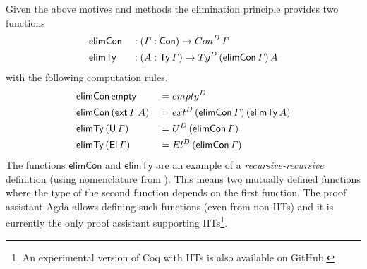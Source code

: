 \documentclass[a4paper,UKenglish,cleveref, autoref]{lipics-v2019}
\begin{document}
Given the above motives and methods the elimination principle provides
two functions
\begin{alignat*}{5}
  & \mathsf{elimCon} && : (\mathit{\Gamma}:\mathsf{Con})\rightarrow Con^D\,\mathit{\Gamma} \\
  & \mathsf{elimTy} && : (A:\mathsf{Ty}\,\mathit{\Gamma})\rightarrow Ty^D\,(\mathsf{elimCon}\,\mathit{\Gamma})\,A
\end{alignat*}
with the following computation rules.
\begin{alignat*}{5}
  & \mathsf{elimCon}\,\mathsf{empty} && = {empty}^D \\
  & \mathsf{elimCon}\,(\mathsf{ext}\,\mathit{\Gamma}\,A) && = {ext}^D\,(\mathsf{elimCon}\,\mathit{\Gamma})\,(\mathsf{elimTy}\,A) \\
  & \mathsf{elimTy}\,(\mathsf{U}\,\mathit{\Gamma}) && = U^D\,(\mathsf{elimCon}\,\mathit{\Gamma}) \\
  & \mathsf{elimTy}\,(\mathsf{El}\,\mathit{\Gamma}) && = El^D\,(\mathsf{elimCon}\,\mathit{\Gamma})
\end{alignat*}
The functions $\mathsf{elimCon}$ and $\mathsf{elimTy}$ are an example
of a \emph{recursive-recursive} definition (using nomenclature from
\cite{forsberg-phd}). This means two mutually defined functions where
the type of the second function depends on the first function. The
proof assistant Agda \cite{norell07thesis} allows defining such
functions (even from non-IITs) and it is currently the only proof
assistant supporting IITs\footnote{An experimental version of Coq with
  IITs is also available on GitHub.}.
\end{document}
